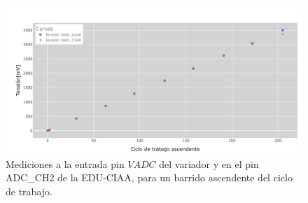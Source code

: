 \begin{figure}[H]
    \centering
    \includegraphics[width=1\linewidth]{Figuras/datalogger/Hardware/MedicionesPWM/pruebaTunelCiaaAsc.png}
    \caption{Mediciones a la entrada pin $VADC$ del variador y en el pin ADC\_CH2 de la EDU-CIAA, para un barrido ascendente  del ciclo de trabajo.}
    \label{fig:pruebaTunelCiaaAsc}
\end{figure}


